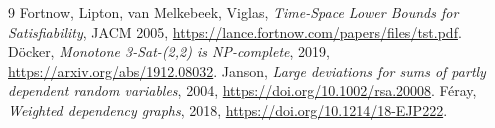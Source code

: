 \documentclass[11pt]{article}
\begin{document}
\begin{thebibliography}{9}
 Fortnow, Lipton, van Melkebeek, Viglas, \emph{Time-Space Lower Bounds for Satisfiability}, JACM 2005, \url{https://lance.fortnow.com/papers/files/tst.pdf}.
 D\"ocker, \emph{Monotone 3-Sat-(2,2) is NP-complete}, 2019, \url{https://arxiv.org/abs/1912.08032}.
 Janson, \emph{Large deviations for sums of partly dependent random variables}, 2004, \url{https://doi.org/10.1002/rsa.20008}.
 F\'eray, \emph{Weighted dependency graphs}, 2018, \url{https://doi.org/10.1214/18-EJP222}.
\end{thebibliography}
\end{document}
